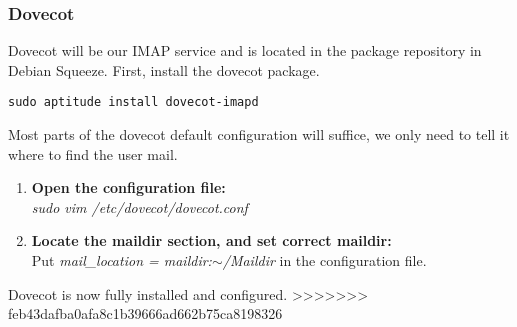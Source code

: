 \subsubsection{Dovecot}
Dovecot will be our IMAP service and is located in the package
repository in Debian Squeeze. First, install the dovecot package.
\begin{lstlisting}
sudo aptitude install dovecot-imapd
\end{lstlisting}
Most parts of the dovecot default configuration will suffice, we only
need to tell it where to find the user mail.
\begin{enumerate}
	\item\textbf{Open the configuration file:}\\
 	\emph{sudo vim /etc/dovecot/dovecot.conf}
	\item\textbf{Locate the maildir section, and set correct maildir:}\\
	Put \emph{mail\_location = maildir:$\sim$/Maildir} in the
	configuration file.
\end{enumerate}
Dovecot is now fully installed and configured.
>>>>>>> feb43dafba0afa8c1b39666ad662b75ca8198326
